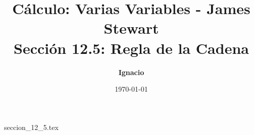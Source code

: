 \documentclass[11pt,spanish,oneside]{report}
\title{\textbf{Cálculo: Varias Variables - James Stewart} \\ \Large Sección 12.5: Regla de la Cadena}
\author{\textbf{Ignacio}}
\date{\today}
\begin{document}
\maketitle

{seccion_12_5.tex}
\end{document}

